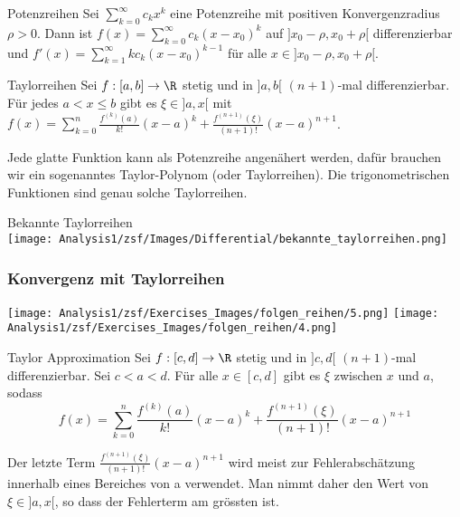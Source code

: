 
\begin{theorem}{Potenzreihen}
	Sei $\sum_{k=0}^\infty c_k x^k$ eine Potenzreihe mit positiven Konvergenzradius $\rho > 0$. Dann ist $f(x) = \sum_{k=0}^\infty c_k (x-x_0)^k$ auf $ ]x_0 - \rho, x_0 + \rho[$ differenzierbar und $f'(x) = \sum_{k=1}^\infty k c_k (x - x_0) ^{k-1}$ für alle $x \in ]x_0 - \rho, x_0 + \rho[$.
\end{theorem}

\begin{theorem}{Taylorreihen}
	Sei $f : [a,b] \to \R$ stetig und in $ ]a,b[$ $(n+1)$-mal differenzierbar.
	Für jedes $a < x \leq b$ gibt es $\xi \in ]a,x[$ mit\\
	$f(x) = \sum_{k=0}^n \frac{f^{(k)} (a)}{k!} (x - a)^k + \frac{f^{(n+1)} (\xi)}{(n+1)!} (x - a)^{n+1}$.
\end{theorem}
\noindent Jede glatte Funktion kann als Potenzreihe angenähert werden, dafür brauchen wir ein sogenanntes Taylor-Polynom (oder Taylorreihen). Die trigonometrischen Funktionen sind genau solche Taylorreihen.
\begin{corollary}{Bekannte Taylorreihen}\\
    \texttt{[image: Analysis1/zsf/Images/Differential/bekannte\_taylorreihen.png]}
\end{corollary}
\subsubsection{Konvergenz mit Taylorreihen}
                    \texttt{[image: Analysis1/zsf/Exercises\_Images/folgen\_reihen/5.png]}
                    \texttt{[image: Analysis1/zsf/Exercises\_Images/folgen\_reihen/4.png]}
\raggedcolumns
\columnbreak
\begin{theorem}[important]{Taylor Approximation}
	Sei $f: [c,d] \to \R$ stetig und in $ ]c,d[$ $(n+1)$-mal differenzierbar.
	Sei $c<a<d$.
	Für alle $x \in [c,d]$ gibt es $\xi$ zwischen $x$ und $a$, sodass
	\begin{equation*}
		f(x) = \sum_{k=0}^n \frac{f^{(k)} (a)}{k!} (x - a)^k + \frac{f^{(n+1)} (\xi)}{(n+1)!} (x - a)^{n+1}
	\end{equation*}
\end{theorem}
\noindent  Der letzte Term $\frac{f^{(n+1)} (\xi)}{(n+1)!} (x - a)^{n+1}$ wird meist zur Fehlerabschätzung innerhalb eines Bereiches von a verwendet. Man nimmt daher den Wert von $\xi \in ]a, x[$, so dass der Fehlerterm am grössten ist.




